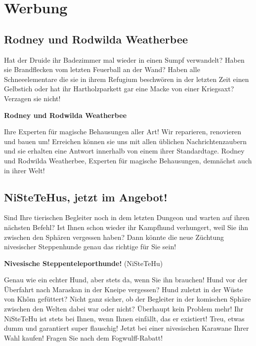 \documentclass[final]{multiversum}
\begin{document}
\section{Werbung}
\subsection{Rodney und Rodwilda Weatherbee}
Hat der Druide ihr Badezimmer mal wieder in einen Sumpf verwandelt?  Haben sie
Brandflecken vom letzten Feuerball an der Wand? Haben alle Schneeelementare die
sie in ihrem Refugium beschwören in der letzten Zeit einen Gelbstich oder hat
ihr Hartholzparkett gar eine Macke von einer Kriegsaxt? Verzagen sie nicht!

\bigskip

\centerline{\textbf{Rodney und Rodwilda Weatherbee}}

\bigskip

Ihre Experten für magische Behausungen aller Art!
Wir reparieren, renovieren und bauen um!  Erreichen können sie uns mit allen
üblichen Nachrichtenzaubern und sie erhalten eine Antwort innerhalb von einem
ihrer Standardtage.  Rodney und Rodwilda Weatherbee, Experten für magische
Behausungen, demnächst auch in ihrer Welt!

\subsection{NiSteTeHus, jetzt im Angebot!}
Sind Ihre tierischen Begleiter noch in dem letzten Dungeon und warten auf ihren
nächsten Befehl?  Ist Ihnen schon wieder ihr Kampfhund verhungert, weil Sie ihn
zwischen den Sphären vergessen haben?  Dann könnte die neue Züchtung nivesischer
Steppenhunde genau das richtige für Sie sein!  

\bigskip

\centerline{\textbf{Nivesische Steppenteleporthunde!}
{\footnotesize(NiSteTeHu)}}

\bigskip

Genau wie ein echter Hund, aber stets da, wenn Sie ihn brauchen!
Hund vor der Überfahrt nach Maraskan in der Kneipe vergessen?  Hund zuletzt in
der Wüste von Khôm gefüttert?  Nicht ganz sicher, ob der Begleiter in der
komischen Sphäre zwischen den Welten dabei war oder nicht? Überhaupt kein
Problem mehr!  Ihr NiSteTeHu ist stets bei Ihnen, wenn Ihnen einfällt, das er
existiert!  Treu, etwas dumm und garantiert super flauschig!  Jetzt bei einer
nivesischen Karawane Ihrer Wahl kaufen! Fragen Sie nach dem Fogwulff-Rabatt!
\end{document}
